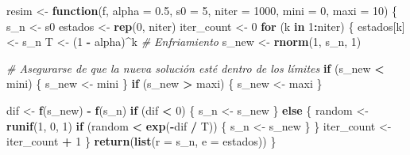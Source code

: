 \documentclass[
]{article}
\newenvironment{Shaded}{\begin{snugshade}}{\end{snugshade}}
\newcommand{\AttributeTok}[1]{\textcolor[rgb]{0.13,0.29,0.53}{#1}}
\newcommand{\CommentTok}[1]{\textcolor[rgb]{0.56,0.35,0.01}{\textit{#1}}}
\newcommand{\ControlFlowTok}[1]{\textcolor[rgb]{0.13,0.29,0.53}{\textbf{#1}}}
\newcommand{\DecValTok}[1]{\textcolor[rgb]{0.00,0.00,0.81}{#1}}
\newcommand{\FloatTok}[1]{\textcolor[rgb]{0.00,0.00,0.81}{#1}}
\newcommand{\FunctionTok}[1]{\textcolor[rgb]{0.13,0.29,0.53}{\textbf{#1}}}
\newcommand{\NormalTok}[1]{#1}
\newcommand{\OtherTok}[1]{\textcolor[rgb]{0.56,0.35,0.01}{#1}}
\newcommand{\SpecialCharTok}[1]{\textcolor[rgb]{0.81,0.36,0.00}{\textbf{#1}}}
\begin{document}
\begin{Shaded}
\begin{Highlighting}[]
\NormalTok{resim }\OtherTok{\textless{}{-}} \ControlFlowTok{function}\NormalTok{(f, }\AttributeTok{alpha =} \FloatTok{0.5}\NormalTok{, }\AttributeTok{s0 =} \DecValTok{5}\NormalTok{, }\AttributeTok{niter =} \DecValTok{1000}\NormalTok{, }\AttributeTok{mini =} \DecValTok{0}\NormalTok{, }\AttributeTok{maxi =} \DecValTok{10}\NormalTok{) \{}
\NormalTok{  s\_n }\OtherTok{\textless{}{-}}\NormalTok{ s0}
\NormalTok{  estados }\OtherTok{\textless{}{-}} \FunctionTok{rep}\NormalTok{(}\DecValTok{0}\NormalTok{, niter)}
\NormalTok{  iter\_count }\OtherTok{\textless{}{-}} \DecValTok{0}
  \ControlFlowTok{for}\NormalTok{ (k }\ControlFlowTok{in} \DecValTok{1}\SpecialCharTok{:}\NormalTok{niter) \{}
\NormalTok{    estados[k] }\OtherTok{\textless{}{-}}\NormalTok{ s\_n}
\NormalTok{    T }\OtherTok{\textless{}{-}}\NormalTok{ (}\DecValTok{1} \SpecialCharTok{{-}}\NormalTok{ alpha)}\SpecialCharTok{\^{}}\NormalTok{k  }\CommentTok{\# Enfriamiento}
\NormalTok{    s\_new }\OtherTok{\textless{}{-}} \FunctionTok{rnorm}\NormalTok{(}\DecValTok{1}\NormalTok{, s\_n, }\DecValTok{1}\NormalTok{)}
    
    \CommentTok{\# Asegurarse de que la nueva solución esté dentro de los límites}
    \ControlFlowTok{if}\NormalTok{ (s\_new }\SpecialCharTok{\textless{}}\NormalTok{ mini) \{ s\_new }\OtherTok{\textless{}{-}}\NormalTok{ mini \}}
    \ControlFlowTok{if}\NormalTok{ (s\_new }\SpecialCharTok{\textgreater{}}\NormalTok{ maxi) \{ s\_new }\OtherTok{\textless{}{-}}\NormalTok{ maxi \}}
    
\NormalTok{    dif }\OtherTok{\textless{}{-}} \FunctionTok{f}\NormalTok{(s\_new) }\SpecialCharTok{{-}} \FunctionTok{f}\NormalTok{(s\_n)}
    \ControlFlowTok{if}\NormalTok{ (dif }\SpecialCharTok{\textless{}} \DecValTok{0}\NormalTok{) \{}
\NormalTok{      s\_n }\OtherTok{\textless{}{-}}\NormalTok{ s\_new}
\NormalTok{    \} }\ControlFlowTok{else}\NormalTok{ \{}
\NormalTok{      random }\OtherTok{\textless{}{-}} \FunctionTok{runif}\NormalTok{(}\DecValTok{1}\NormalTok{, }\DecValTok{0}\NormalTok{, }\DecValTok{1}\NormalTok{)}
      \ControlFlowTok{if}\NormalTok{ (random }\SpecialCharTok{\textless{}} \FunctionTok{exp}\NormalTok{(}\SpecialCharTok{{-}}\NormalTok{dif }\SpecialCharTok{/}\NormalTok{ T)) \{}
\NormalTok{        s\_n }\OtherTok{\textless{}{-}}\NormalTok{ s\_new}
\NormalTok{      \}}
\NormalTok{    \}}
\NormalTok{    iter\_count }\OtherTok{\textless{}{-}}\NormalTok{ iter\_count }\SpecialCharTok{+} \DecValTok{1}
\NormalTok{  \}}
  \FunctionTok{return}\NormalTok{(}\FunctionTok{list}\NormalTok{(}\AttributeTok{r =}\NormalTok{ s\_n, }\AttributeTok{e =}\NormalTok{ estados))}
\NormalTok{\}}
\end{Highlighting}
\end{Shaded}
\end{document}
